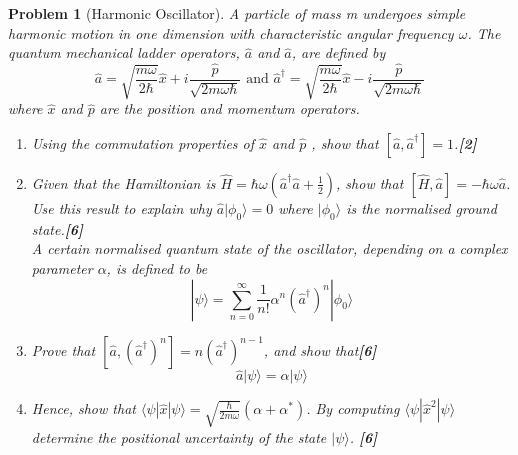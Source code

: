 \documentclass[a4paper]{article}
\theoremstyle{new}
\newtheorem{qns}{Problem}[subsection]
\begin{document}
\newpage
\begin{qns}[Harmonic Oscillator]
A particle of mass m undergoes simple harmonic motion in one dimension with characteristic angular frequency $\omega$. The quantum mechanical ladder operators, $\hat{a}$ and $\hat{a}$, are defined by
$$\hat{a}=\sqrt{\frac{m\omega}{2\hbar}}\hat{x}+i\frac{\hat{p}}{\sqrt{2m\omega\hbar}}\text{  and  }\hat{a}^\dag=\sqrt{\frac{m\omega}{2\hbar}}\hat{x}-i\frac{\hat{p}}{\sqrt{2m\omega\hbar}}$$
where $\hat{x}$ and $\hat{p}$ are the position and momentum operators.
\begin{enumerate}[label=(\roman*)]
\item Using the commutation properties of $\hat{x}$ and $\hat{p}$ , show that $[\hat{a},\hat{a}^\dag]=1$.\hfill\textbf{[2]}
\item Given that the Hamiltonian is $\hat{H}=\hbar\omega(\hat{a}^\dag\hat{a}+\frac{1}{2})$, show that $[\hat{H},\hat{a}]=-\hbar\omega\hat{a}$. Use this result to explain why $\hat{a}|\phi_0\rangle=0$ where $|\phi_0\rangle$ is the normalised ground state.\hfill\textbf{[6]}\\[5pt]
A certain normalised quantum state of the oscillator, depending on a complex parameter $\alpha$, is defined to be
$$|\psi\rangle=\sum_{n=0}^\infty\frac{1}{n!}\alpha^n(\hat{a}^\dag)^n|\phi_0\rangle$$
\item Prove that $[\hat{a},(\hat{a}^\dag)^n]=n(\hat{a}^\dag)^{n-1}$, and show that\hfill\textbf{[6]}
$$\hat{a}|\psi\rangle=\alpha|\psi\rangle$$
\item Hence, show that $\langle\psi|\hat{x}|\psi\rangle=\sqrt{\frac{\hbar}{2m\omega}}(\alpha+\alpha^*)$. By computing $\langle\psi|\hat{x}^2|\psi\rangle$ determine the positional uncertainty of the state $|\psi\rangle$. \hfill\textbf{[6]}
\end{enumerate}
\end{qns}
\end{document}
